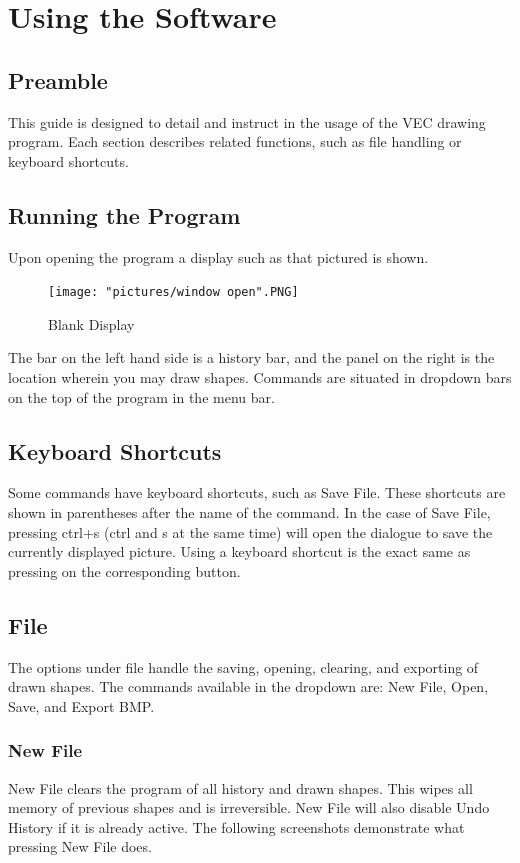\documentclass[12pt]{article} %
\begin{document}
\newpage

\section{Using the Software}

\subsection{Preamble}
This guide is designed to detail and instruct in the usage of the VEC drawing program. Each section describes related functions, such as file handling or keyboard shortcuts.

\subsection{Running the Program}
Upon opening the program a display such as that pictured is shown. 

\begin{figure}[hbtp]
\caption{Blank Display}
\centering
\texttt{[image: "pictures/window open".PNG]}
\end{figure}


The bar on the left hand side is a history bar, and the panel on the right is the location wherein you may draw shapes. Commands are situated in dropdown bars on the top of the program in the menu bar. 

\subsection{Keyboard Shortcuts}
Some commands have keyboard shortcuts, such as Save File. These shortcuts are shown in parentheses after the name of the command. In the case of Save File, pressing ctrl+s (ctrl and s at the same time) will open the dialogue to save the currently displayed picture. Using a keyboard shortcut is the exact same as pressing on the corresponding button.

\subsection{File}
The options under file handle the saving, opening, clearing, and exporting of drawn shapes. The commands available in the dropdown are: New File, Open, Save, and Export BMP.

\subsubsection{New File}
New File clears the program of all history and drawn shapes. This wipes all memory of previous shapes and is irreversible. New File will also disable Undo History if it is already active. The following screenshots demonstrate what pressing New File does.
\end{document}
